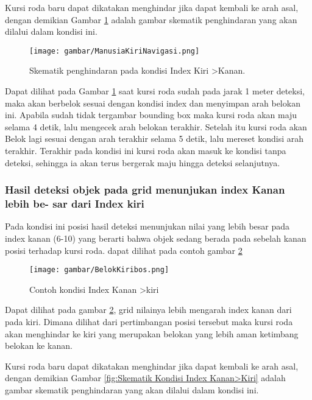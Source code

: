 Kursi roda baru dapat dikatakan menghindar jika dapat kembali ke arah asal, dengan demikian Gambar \ref{fig:Skematik Kondisi Index Kiri>Kanan.} adalah gambar skematik penghindaran yang akan dilalui dalam kondisi ini.

\begin{figure}[H]
  \centering
  \texttt{[image: gambar/ManusiaKiriNavigasi.png]}
  \caption{Skematik penghindaran pada kondisi Index Kiri \textgreater Kanan.}
  \label{fig:Skematik Kondisi Index Kiri>Kanan.}
\end{figure}

Dapat dilihat pada Gambar \ref{fig:Skematik Kondisi Index Kiri>Kanan.} saat kursi roda sudah pada jarak 1 meter deteksi, maka akan berbelok sesuai dengan kondisi index dan menyimpan arah belokan ini. Apabila sudah tidak tergambar bounding box maka kursi roda akan maju selama 4 detik, lalu mengecek arah belokan terakhir. Setelah itu kursi roda akan Belok lagi sesuai dengan arah terakhir selama 5 detik, lalu mereset kondisi arah terakhir. Terakhir pada kondisi ini kursi roda akan masuk ke kondisi tanpa deteksi, sehingga ia akan terus bergerak maju hingga deteksi selanjutnya.

\subsubsection{ Hasil deteksi objek pada grid menunjukan index Kanan lebih be-
sar dari Index kiri}

Pada kondisi ini posisi hasil deteksi menunjukan nilai yang lebih besar pada index kanan (6-10) yang berarti bahwa objek sedang berada pada sebelah kanan posisi terhadap kursi roda. dapat dilihat pada contoh gambar \ref{fig:Kondisi Index Kanan>Kiri}

\begin{figure}[H]
    \centering
    \texttt{[image: gambar/BelokKiribos.png]}
    \caption{Contoh kondisi Index Kanan \textgreater kiri}
    \label{fig:Kondisi Index Kanan>Kiri}
\end{figure}

Dapat dilihat pada gambar \ref{fig:Kondisi Index Kanan>Kiri}, grid nilainya lebih mengarah index kanan dari pada kiri. Dimana dilihat dari pertimbangan posisi tersebut maka kursi roda akan menghindar ke kiri yang merupakan belokan yang lebih aman ketimbang belokan ke kanan.

Kursi roda baru dapat dikatakan menghindar jika dapat kembali ke arah asal, dengan demikian Gambar \ref{fig:Skematik Kondisi Index Kanan>Kiri} adalah gambar skematik penghindaran yang akan dilalui dalam kondisi ini.

